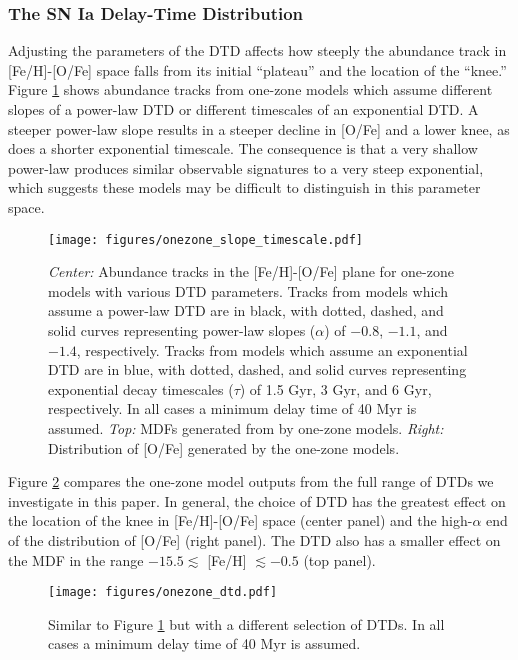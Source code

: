 \documentclass[twocolumn]{aastex631}
\begin{document}
\subsubsection{The SN Ia Delay-Time Distribution}

Adjusting the parameters of the DTD affects how steeply the abundance track in [Fe/H]-[O/Fe] space falls from its initial ``plateau'' and the location of the ``knee.'' Figure \ref{fig:onezone-slope-timescale} shows abundance tracks from one-zone models which assume different slopes of a power-law DTD or different timescales of an exponential DTD. A steeper power-law slope results in a steeper decline in [O/Fe] and a lower knee, as does a shorter exponential timescale. The consequence is that a very shallow power-law produces similar observable signatures to a very steep exponential, which suggests these models may be difficult to distinguish in this parameter space.

\begin{figure}
    \centering
    \texttt{[image: figures/onezone\_slope\_timescale.pdf]}
    \caption{\textit{Center:} Abundance tracks in the [Fe/H]-[O/Fe] plane for one-zone models with various DTD parameters. Tracks from models which assume a power-law DTD are in black, with dotted, dashed, and solid curves representing power-law slopes ($\alpha$) of $-0.8$, $-1.1$, and $-1.4$, respectively. Tracks from models which assume an exponential DTD are in blue, with dotted, dashed, and solid curves representing exponential decay timescales ($\tau$) of 1.5 Gyr, 3 Gyr, and 6 Gyr, respectively. In all cases a minimum delay time of 40 Myr is assumed. \textit{Top:} MDFs generated from by one-zone models. \textit{Right:} Distribution of [O/Fe] generated by the one-zone models.}
    \label{fig:onezone-slope-timescale}
\end{figure}

Figure \ref{fig:onezone-dtd} compares the one-zone model outputs from the full range of DTDs we investigate in this paper. In general, the choice of DTD has the greatest effect on the location of the knee in [Fe/H]-[O/Fe] space (center panel) and the high-$\alpha$ end of the distribution of [O/Fe] (right panel). The DTD also has a smaller effect on the MDF in the range $-15.5\lesssim$ [Fe/H] $\lesssim-0.5$ (top panel).

\begin{figure}
    \centering
    \texttt{[image: figures/onezone\_dtd.pdf]}
    \caption{Similar to Figure \ref{fig:onezone-slope-timescale} but with a different selection of DTDs. In all cases a minimum delay time of 40 Myr is assumed.}
    \label{fig:onezone-dtd}
\end{figure}
\end{document}

